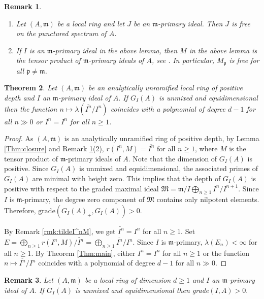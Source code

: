 \documentclass[11pt]{amsart}
\theoremstyle{plain}
\newtheorem{theorem}{Theorem}[section]
\newtheorem{remark}[theorem]{Remark}
\newcommand{\p}{\mathfrak{p}}
\newcommand{\m}{\mathfrak{m}}
\newcommand{\wt}{\widetilde}
\theoremstyle{plain}
\begin{document}
\begin{remark}
\label{Thm:free}

\begin{enumerate}
\item  Let $(A,\m)$ be a local ring and let $J$ be an $\m$-primary ideal. Then $J$ is free on the punctured spectrum of $A$.
    \item If $I$ is an $\m$-primary ideal in the above lemma, then $M$ in the above lemma is the tensor product of $\m$-primary ideals of $A$, see \cite[Theorem 4.4]{Zulfeqarr}. In particular, $M_{\p}$ is free for all $\p \neq \m$.

\end{enumerate}

\end{remark}
\begin{theorem}
\label{Thm:integralclosure}
    Let $(A,\m)$ be an analytically unramified local ring of positive depth and $I$ an $\m$-primary ideal of $A.$ If $G_I(A)$ is unmixed and equidimensional then the function $n\mapsto \lambda({\overline{I^n}/{I^n}})$ coincides with a polynomial of degree $d-1$ for all $n\gg0$ or $\overline{I^n}={I^n}$ for all $n\geq 1$.
\end{theorem}
\begin{proof}
    As $(A,\m)$ is an analytically unramified ring of positive depth, by Lemma \ref{Thm:closure} and Remark \ref{Thm:free}(2), $r(I^n,M)=\overline{I^n}$ for all $n\geq 1$, where $M$ is the tensor product of $\m$-primary ideals of $A$. Note that the dimension of $G_I(A)$ is positive. Since  $G_I(A)$ is unmixed and equidimensional, the associated primes of $G_I(A)$ are minimal with height zero. This implies that the depth of $G_I(A)$ is positive with respect to the graded maximal ideal $\mathfrak{M}=\m/I\bigoplus_{n\geq 1}I^n/I^{n+1}$. Since $I$ is $\m$-primary, the degree zero component of $\mathfrak{M}$ contains only nilpotent elements. Therefore, $\text{grade}(G_I(A)_{+}, G_I(A))>0.$

    By Remark \ref{rmk:tildeI^nM}, we get $\wt{I^n}=I^n$ for all $n\geq 1.$ Set $E=\bigoplus_{n\geq 1}r(I^n,M)/\wt{I^n}=\bigoplus_{n\geq 1}\overline{I^n}/{I^n}$. Since $I$ is $\m$-primary, $\lambda(E_n)<\infty$ for all $n\geq 1$. By Theorem \ref{Thm:main}, either $\overline{I^n}={I^n}$ for all $n\geq 1$ or the function $n\mapsto \overline{I^n}/I^n$ coincides with a polynomial of degree $d-1$ for all $n\gg0$.
\end{proof}

\begin{remark}
Let $(A,\m)$ be a local ring of dimension $d\geq 1$ and $I$ an $\m$-primary ideal of $A$. If $G_I(A)$ is unmixed and equidimensional then grade$(I,A)>0.$
\end{remark}
\end{document}
